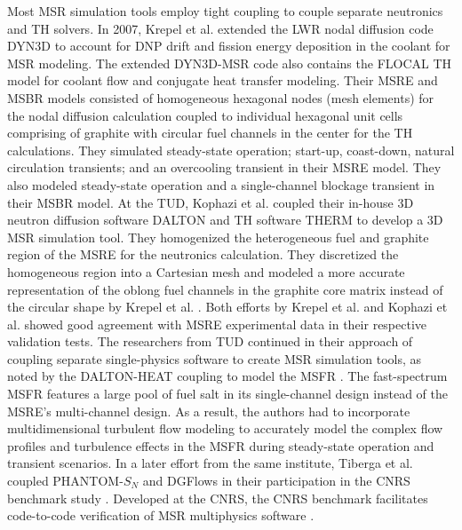 Most \gls{MSR} simulation tools employ tight coupling to couple separate neutronics and
\gls{TH} solvers. In 2007, Krepel et al. \cite{krepel_dyn3d-msr_2007} extended the
\gls{LWR} nodal diffusion code DYN3D to account for \gls{DNP} drift and fission energy deposition
in the coolant for \gls{MSR} modeling. The extended DYN3D-MSR code also contains the FLOCAL
\gls{TH} model for coolant flow and conjugate heat transfer modeling. Their \gls{MSRE} and
\gls{MSBR} models consisted of homogeneous hexagonal nodes (mesh elements) for the nodal diffusion
calculation coupled to individual hexagonal unit cells comprising of graphite with circular fuel
channels in the center for the \gls{TH} calculations. They simulated steady-state operation;
start-up, coast-down, natural circulation transients; and an overcooling transient in their
\gls{MSRE} model. They also modeled steady-state operation and a single-channel blockage transient
in their \gls{MSBR} model. At the \gls{TUD}, Kophazi et al. \cite{kophazi_development_2009} coupled
their in-house 3D neutron diffusion software DALTON \cite{boer_validation_2010} and \gls{TH}
software THERM to develop a 3D \gls{MSR} simulation tool. They homogenized the heterogeneous fuel
and graphite region of the \gls{MSRE} for the neutronics calculation. They discretized the
homogeneous region into a Cartesian mesh and modeled a more accurate representation of the oblong
fuel channels in the graphite core matrix instead of the circular shape by Krepel et al.
\cite{krepel_dyn3d-msr_2007}. Both efforts by Krepel et al. and Kophazi et al. showed good
agreement with \gls{MSRE} experimental data in their respective validation tests.
The researchers from \gls{TUD} continued in their approach of coupling separate single-physics
software to create \gls{MSR} simulation tools, as noted by the DALTON-HEAT
\cite{de_zwaan_static_2007} coupling to model the \gls{MSFR} \cite{fiorina_modelling_2014}. The
fast-spectrum \gls{MSFR} features a large pool of fuel salt in its single-channel design instead of
the \gls{MSRE}'s multi-channel design. As a result, the authors had to incorporate
multidimensional turbulent flow modeling to accurately model the complex flow profiles and
turbulence effects in the \gls{MSFR} during steady-state operation and transient scenarios. In a
later effort from the same institute, Tiberga et al. \cite{tiberga_discontinuous_2019} coupled
PHANTOM-$S_N$ and DGFlows in their participation in the CNRS benchmark study
\cite{tiberga_results_2020}. Developed at the \gls{CNRS}, the CNRS benchmark facilitates
code-to-code verification of \gls{MSR} multiphysics software \cite{aufiero_testing_2018}.

